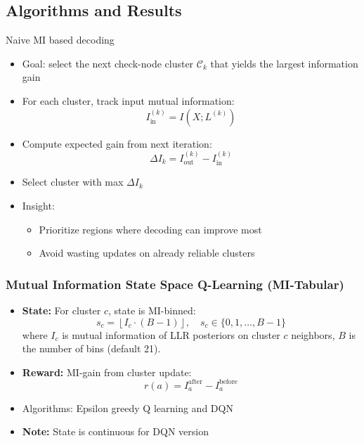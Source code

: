 \documentclass{beamer}
\begin{document}
\subsection{Algorithms and Results}

\begin{frame}{Naive MI based decoding}
\begin{itemize}
    \item Goal: select the next check-node cluster $\mathcal{C}_k$ that yields the largest information gain

    \item For each cluster, track input mutual information:
    \[
    I^{(k)}_{\text{in}} = I(X; L^{(k)})
    \]
    \item Compute expected gain from next iteration:
    \[
    \Delta I_k = I^{(k)}_{\text{out}} - I^{(k)}_{\text{in}}
    \]

    \item Select cluster with max $\Delta I_k$

    \item Insight:
    \begin{itemize}
        \item Prioritize regions where decoding can improve most
        \item Avoid wasting updates on already reliable clusters
    \end{itemize}
\end{itemize}
\end{frame}


\begin{frame}
\frametitle{Mutual Information State Space Q-Learning (MI-Tabular)}
\begin{itemize}
    \item \textbf{State:} For cluster $c$, state is MI-binned:
    $$s_c = \left\lfloor I_c \cdot (B-1) \right\rfloor, \quad s_c \in \{0, 1, \ldots, B-1\}$$
    where $I_c$ is mutual information of LLR posteriors on cluster $c$ neighbors, $B$ is the number of bins (default 21).
    
    \item \textbf{Reward:} MI-gain from cluster update:
    $$r(a) = I_a^{\text{after}} - I_a^{\text{before}}$$    
    
    \item Algorithms: Epsilon greedy Q learning and DQN
    
    \item \textbf{Note: } State is continuous for DQN version
\end{itemize}


\end{frame}
\end{document}
